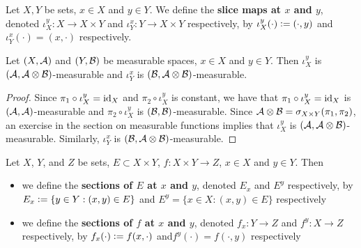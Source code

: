 \documentclass{book}
\begin{document}
	
	
	
	
	
	
	
	
	
	
	
	
	
	
	
	
	
	
	
	
	
	
	
	
	

	\begin{defn} 
		Let $X, Y$ be sets, $x \in X$ and $y \in Y$. We define the \textbf{slice maps at $x$ and $y$}, denoted $\iota^y_X: X \rightarrow X \times Y$ and $\iota^x_Y: Y \rightarrow X \times Y$ respectively, by $\iota^y_X(\cdot) \vcentcolon= (\cdot, y)$ and $\iota^x_Y(\cdot) = (x, \cdot)$ respectively. 
	\end{defn}
	
	\begin{ex} 
		Let $(X, \mathcal{A} )$ and $(Y, \mathcal{B})$ be measurable spaces, $x \in X$ and $y \in Y$. Then $\iota^y_X$ is $(\mathcal{A}, \mathcal{A} \otimes \mathcal{B})$-measurable and $\iota^x_Y$  is $(\mathcal{B}, \mathcal{A} \otimes \mathcal{B})$-measurable.
	\end{ex}
	
	\begin{proof}
		Since $\pi_1 \circ \iota^y_X = \operatorname{id}_{X}$ and $\pi_2 \circ \iota^y_X$ is constant, we have that $\pi_1 \circ \iota^y_X = \operatorname{id}_{X}$ is $(\mathcal{A}, \mathcal{A})$-measurable and $\pi_2 \circ \iota^y_X$ is $(\mathcal{B}, \mathcal{B})$-measurable. Since $\mathcal{A} \otimes \mathcal{B} = \sigma_{X \times Y}(\pi_1, \pi_2)$, an exercise in the section on measurable functions implies that $\iota^y_X$ is $(\mathcal{A}, \mathcal{A} \otimes \mathcal{B})$-measurable. Similarly, $\iota^x_Y$ is $(\mathcal{B}, \mathcal{A} \otimes \mathcal{B})$-measurable.
	\end{proof}
	
	\begin{defn}  
		Let $X$, $Y$, and $Z$ be sets, $E \subset X \times Y$, $f :X \times Y \rightarrow Z$, $x \in X$ and $y \in Y$. Then
		\begin{itemize}
			\item we define the \textbf{sections of $E$ at $x$ and $y$}, denoted $E_x$ and $E^y$ respectively, by $E_x \vcentcolon= \{y \in Y: (x,y) \in E\}$ and $E^y = \{x \in X: (x,y) \in E\}$ respectively
			\item we define the \textbf{sections of $f$ at $x$ and $y$}, denoted $f_x:Y \rightarrow Z$ and $f^y:X \rightarrow Z$ respectively, by $f_x(\cdot) \vcentcolon= f(x,\cdot)$ and$f^y(\cdot) = f(\cdot,y)$  respectively 
		\end{itemize}
	\end{defn}
\end{document}

